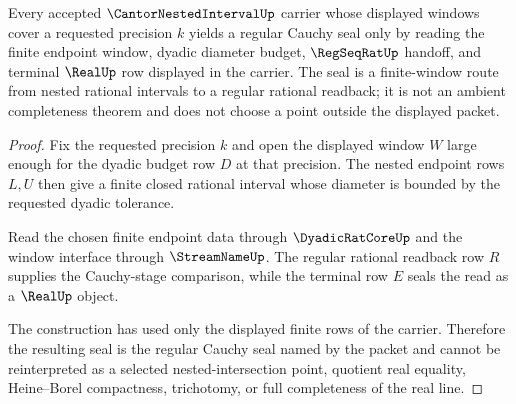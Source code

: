 \begin{theorem}
\label{thm:cantor-nested-interval-regular-cauchy-seal}
Every accepted $\CantorNestedIntervalUp$ carrier whose displayed windows cover a requested precision $k$ yields a regular Cauchy seal only by reading the finite endpoint window, dyadic diameter budget, $\RegSeqRatUp$ handoff, and terminal $\RealUp$ row displayed in the carrier. The seal is a finite-window route from nested rational intervals to a regular rational readback; it is not an ambient completeness theorem and does not choose a point outside the displayed packet.
\end{theorem}
\begin{proof}
Fix the requested precision $k$ and open the displayed window $W$ large enough for the dyadic budget row $D$ at that precision. The nested endpoint rows $L,U$ then give a finite closed rational interval whose diameter is bounded by the requested dyadic tolerance.

Read the chosen finite endpoint data through $\DyadicRatCoreUp$ and the window interface through $\StreamNameUp$. The regular rational readback row $R$ supplies the Cauchy-stage comparison, while the terminal row $E$ seals the read as a $\RealUp$ object.

The construction has used only the displayed finite rows of the carrier. Therefore the resulting seal is the regular Cauchy seal named by the packet and cannot be reinterpreted as a selected nested-intersection point, quotient real equality, Heine--Borel compactness, trichotomy, or full completeness of the real line.
\end{proof}

\begin{closurestatus}{\CantorNestedIntervalUp}
  \theoryclosure{\seedClosure}
  \formalstatus{\unformalizedV}
\end{closurestatus}
